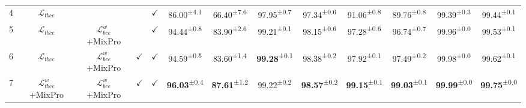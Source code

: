 \begin{table*}[!t]
{\begin{tabular}{ccccccccccccc}
    4                     & $\mathcal{L}_{tbce}$                                                      &                                &              & $\checkmark$  & 86.00\textsuperscript{±4.1}          & 66.40\textsuperscript{±7.6}          & 97.95\textsuperscript{±0.7}          & 97.34\textsuperscript{±0.6}          & 91.06\textsuperscript{±0.8}          & 89.76\textsuperscript{±0.8}          & 99.39\textsuperscript{±0.3}          & 99.44\textsuperscript{±0.1}           \\ 
    \cline{2-13}
    5                     & $\mathcal{L}_{tbce}$                                                      & $\mathcal{L}_{bce}^{w}$+MixPro &              & $\checkmark$  & 94.44\textsuperscript{±0.8}          & 83.90\textsuperscript{±2.6}          & 99.21\textsuperscript{±0.1}          & 98.15\textsuperscript{±0.6}          & 97.28\textsuperscript{±0.6}          & 96.74\textsuperscript{±0.7}          & 99.96\textsuperscript{±0.0}          & 99.53\textsuperscript{±0.1}           \\
    6                     & $\mathcal{L}_{tbce}$                                                      & $\mathcal{L}_{bce}^{w}$+MixPro & $\checkmark$ & $\checkmark$  & 94.59\textsuperscript{±0.5}          & 83.60\textsuperscript{±1.4}          & \textbf{99.28}\textsuperscript{±0.1} & 98.38\textsuperscript{±0.2}          & 97.92\textsuperscript{±0.1}          & 97.49\textsuperscript{±0.2}          & 99.98\textsuperscript{±0.0}          & 99.62\textsuperscript{±0.1}           \\
    7                     & $\mathcal{L}_{tbce}^{w}$+MixPro                                           & $\mathcal{L}_{bce}^{w}$+MixPro & $\checkmark$ & $\checkmark$  & \textbf{96.03}\textsuperscript{±0.4} & \textbf{87.61}\textsuperscript{±1.2} & 99.22\textsuperscript{±0.2}          & \textbf{98.57}\textsuperscript{±0.2} & \textbf{99.15}\textsuperscript{±0.1} & \textbf{99.03}\textsuperscript{±0.1} & \textbf{99.99}\textsuperscript{±0.0} & \textbf{99.75}\textsuperscript{±0.0}  \\
    \hline
    \end{tabular}
    }
    \end{table*}